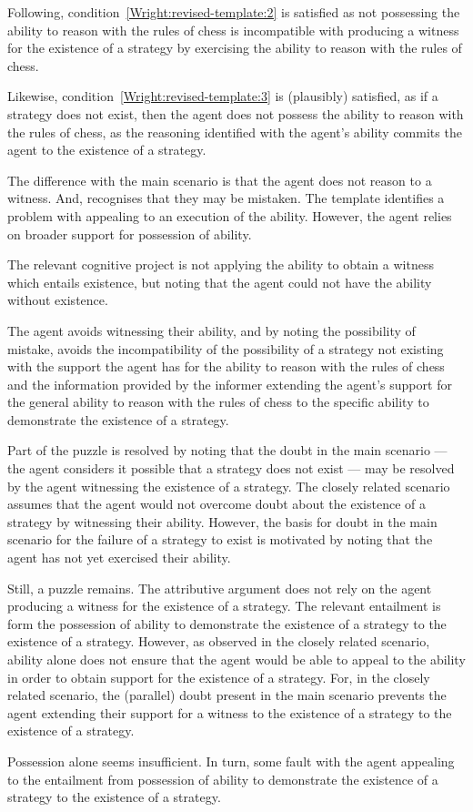 \documentclass[10pt]{article}
\begin{document}
\begin{note}
  Following, condition~\ref{Wright:revised-template:2} is satisfied as not possessing the ability to reason with the rules of chess is incompatible with producing a witness for the existence of a strategy by exercising the ability to reason with the rules of chess.

  Likewise, condition~\ref{Wright:revised-template:3} is (plausibly) satisfied, as if a strategy does not exist, then the agent does not possess the ability to reason with the rules of chess, as the reasoning identified with the agent's ability commits the agent to the existence of a strategy.

  The difference with the main scenario is that the agent does not reason to a witness.
  And, recognises that they may be mistaken.
  The template identifies a problem with appealing to an execution of the ability.
  However, the agent relies on broader support for possession of ability.

  The relevant cognitive project is not applying the ability to obtain a witness which entails existence, but noting that the agent could not have the ability without existence.

  The agent avoids witnessing their ability, and by noting the possibility of mistake, avoids the incompatibility of the possibility of a strategy not existing with the support the agent has for the ability to reason with the rules of chess and the information provided by the informer extending the agent's support for the general ability to reason with the rules of chess to the specific ability to demonstrate the existence of a strategy.

  Part of the puzzle is resolved by noting that the doubt in the main scenario --- the agent considers it possible that a strategy does not exist --- may be resolved by the agent witnessing the existence of a strategy.
  The closely related scenario assumes that the agent would not overcome doubt about the existence of a strategy by witnessing their ability.
  However, the basis for doubt in the main scenario for the failure of a strategy to exist is motivated by noting that the agent has not yet exercised their ability.

  Still, a puzzle remains.
  The attributive argument does not rely on the agent producing a witness for the existence of a strategy.
  The relevant entailment is form the possession of ability to demonstrate the existence of a strategy to the existence of a strategy.
  However, as observed in the closely related scenario, ability alone does not ensure that the agent would be able to appeal to the ability in order to obtain support for the existence of a strategy.
  For, in the closely related scenario, the (parallel) doubt present in the main scenario prevents the agent extending their support for a witness to the existence of a strategy to the existence of a strategy.

  Possession alone seems insufficient.
  In turn, some fault with the agent appealing to the entailment from possession of ability to demonstrate the existence of a strategy to the existence of a strategy.
\end{note}
\end{document}
